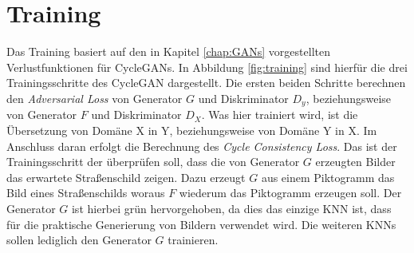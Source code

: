 


\section{Training}
Das Training basiert auf den in Kapitel \ref{chap:GANs} vorgestellten Verlustfunktionen für \acp{CycleGAN}. In Abbildung \ref{fig:training} sind hierfür die drei Trainingsschritte des \ac{CycleGAN} dargestellt. Die ersten beiden Schritte berechnen den \emph{Adversarial Loss} von Generator $G$ und Diskriminator $D_y$, beziehungsweise von Generator $F$ und Diskriminator $D_X$. Was hier trainiert wird, ist die Übersetzung von Domäne X in Y, beziehungsweise von Domäne Y in X. Im Anschluss daran erfolgt die Berechnung des \emph{Cycle Consistency Loss}. Das ist der Trainingsschritt der überprüfen soll, dass die von Generator $G$ erzeugten Bilder das erwartete Straßenschild zeigen. Dazu erzeugt $G$ aus einem Piktogramm das Bild eines Straßenschilds woraus $F$ wiederum das Piktogramm erzeugen soll. Der Generator $G$ ist hierbei grün hervorgehoben, da dies das einzige \ac{KNN} ist, dass für die praktische Generierung von Bildern verwendet wird. Die weiteren \acp{KNN} sollen lediglich den Generator $G$ trainieren. \cite{cycleGAN}


